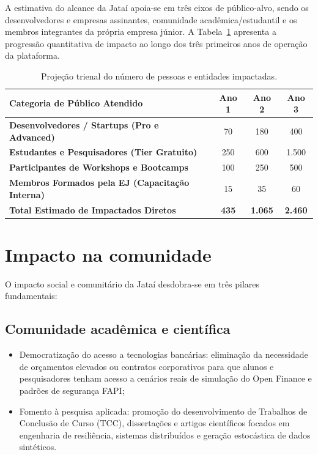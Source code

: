 \documentclass[
  12pt,
  openright,
  oneside,
  a4paper,
  brazilian
]{abntex2}
\begin{document}
A estimativa do alcance da Jataí apoia-se em três eixos de público-alvo, sendo os desenvolvedores e empresas assinantes, comunidade acadêmica/estudantil e os membros integrantes da própria empresa júnior. A Tabela~\ref{tab:projecao_atendidos} apresenta a progressão quantitativa de impacto ao longo dos três primeiros anos de operação da plataforma.

\begin{table}[htbp]
\centering
\caption{Projeção trienal do número de pessoas e entidades impactadas.}
\label{tab:projecao_atendidos}
\begin{tabular}{|l|c|c|c|}
\hline
\textbf{Categoria de Público Atendido} & \textbf{Ano 1} & \textbf{Ano 2} & \textbf{Ano 3} \\ \hline
\textbf{Desenvolvedores / Startups (Pro e Advanced)} & 70 & 180 & 400 \\ \hline
\textbf{Estudantes e Pesquisadores (Tier Gratuito)} & 250 & 600 & 1.500 \\ \hline
\textbf{Participantes de Workshops e Bootcamps} & 100 & 250 & 500 \\ \hline
\textbf{Membros Formados pela EJ (Capacitação Interna)} & 15 & 35 & 60 \\ \hline
\textbf{Total Estimado de Impactados Diretos} & \textbf{435} & \textbf{1.065} & \textbf{2.460} \\ \hline
\end{tabular}
\end{table}

\section{Impacto na comunidade}
\label{sec:impacto_comunidade}

O impacto social e comunitário da Jataí desdobra-se em três pilares fundamentais:

\subsection{Comunidade acadêmica e científica}
\begin{itemize}
    \item{Democratização do acesso a tecnologias bancárias:} eliminação da necessidade de orçamentos elevados ou contratos corporativos para que alunos e pesquisadores tenham acesso a cenários reais de simulação do Open Finance e padrões de segurança FAPI;
    \item{Fomento à pesquisa aplicada:} promoção do desenvolvimento de Trabalhos de Conclusão de Curso (TCC), dissertações e artigos científicos focados em engenharia de resiliência, sistemas distribuídos e geração estocástica de dados sintéticos.
\end{itemize}
\end{document}
